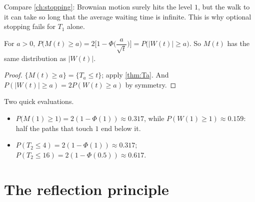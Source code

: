 Compare \cref{ch:stopping}: Brownian motion surely hits the level $1$, but the walk to it can take so long that the average waiting time is infinite. This is why optional stopping fails for $T_1$ alone.

\begin{pic}
\end{pic}

\begin{result}
\label{res:max}
For $a>0$, $P\big(M(t)\ge a\big)=2\Big[1-\Phi\Big(\dfrac{a}{\sqrt t}\Big)\Big]=P\big(|W(t)|\ge a\big)$. So $M(t)$ has the same distribution as $|W(t)|$.
\end{result}
\begin{proof}
$\{M(t)\ge a\}=\{T_a\le t\}$; apply \cref{thm:Ta}. And $P(|W(t)|\ge a)=2P(W(t)\ge a)$ by symmetry.
\end{proof}

\begin{example}[Numbers]
\label{ex:max-num}
Two quick evaluations.
\begin{itemize}
  \item $P\big(M(1)\ge1\big)=2(1-\Phi(1))\approx0.317$, while $P(W(1)\ge1)\approx0.159$: half the paths that touch $1$ end below it.
  \item $P(T_2\le4)=2(1-\Phi(1))\approx0.317$; $P(T_2\le16)=2(1-\Phi(0.5))\approx0.617$.
\end{itemize}
\end{example}

\section{The reflection principle}

